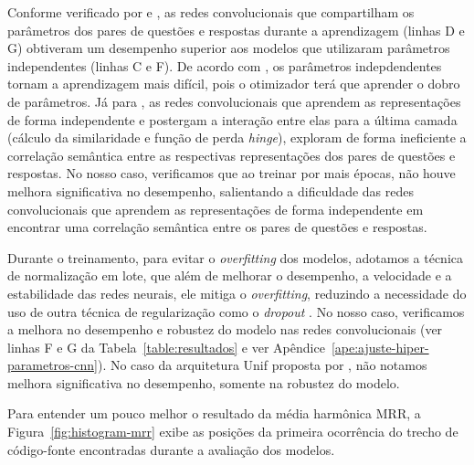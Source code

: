 Conforme verificado por \cite{tan-lstm-qa} e \cite{feng-2015}, as redes convolucionais que compartilham os parâmetros dos pares de questões e respostas durante a aprendizagem (linhas D e G) obtiveram um desempenho superior aos modelos que utilizaram parâmetros independentes (linhas C e F). De acordo com \cite{tan-lstm-qa}, os parâmetros indepdendentes tornam a aprendizagem mais difícil, pois o otimizador terá que aprender o dobro de parâmetros. Já para \cite{wen-joint-modeling-question-answer-2019}, as redes convolucionais que aprendem as representações de forma independente e postergam a interação entre elas para a última camada (cálculo da similaridade e função de perda \textit{hinge}), exploram de forma ineficiente a correlação semântica entre as respectivas representações dos pares de questões e respostas. No nosso caso, verificamos que ao treinar por mais épocas, não houve melhora significativa no desempenho, salientando a dificuldade das redes convolucionais que aprendem as representações de forma independente em encontrar uma correlação semântica entre os pares de questões e respostas.

Durante o treinamento, para evitar o \textit{overfitting} dos modelos, adotamos a técnica de normalização em lote, que além de melhorar o desempenho, a velocidade e a estabilidade das redes neurais, ele mitiga o \textit{overfitting}, reduzindo a necessidade do uso de outra técnica de regularização como o \textit{dropout} \citep{sergey-batch-normalization-2015}. No nosso caso, verificamos a melhora no desempenho e robustez do modelo nas redes convolucionais (ver linhas F e G da Tabela~\ref{table:resultados} e ver Apêndice~\ref{ape:ajuste-hiper-parametros-cnn}). No caso da arquitetura Unif proposta por \cite{cambronero-deep-learning-code-search:2019}, não notamos melhora significativa no desempenho, somente na robustez do modelo.


Para entender um pouco melhor o resultado da média harmônica MRR, a Figura~\ref{fig:histogram-mrr} exibe as posições da primeira ocorrência do trecho de código-fonte encontradas durante a avaliação dos modelos.

